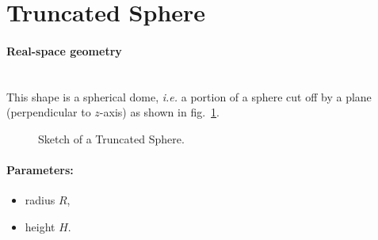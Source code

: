 
\newpage
\section{Truncated Sphere}
  
\paragraph{Real-space geometry}\mbox{}\\
This shape is a spherical dome, \textit{i.e.} a portion of a sphere cut off by a plane (perpendicular
to $z$-axis) as shown in fig.~\ref{fig:sphere}.

\begin{figure}[ht]
\hfill
{}
\hfill
{}
\hfill
\caption{Sketch of a Truncated Sphere.}
\label{fig:sphere}
\end{figure}
\FloatBarrier

\paragraph{Parameters:}
\begin{itemize}
\item radius $R$,
\item height $H$.
\end{itemize}

